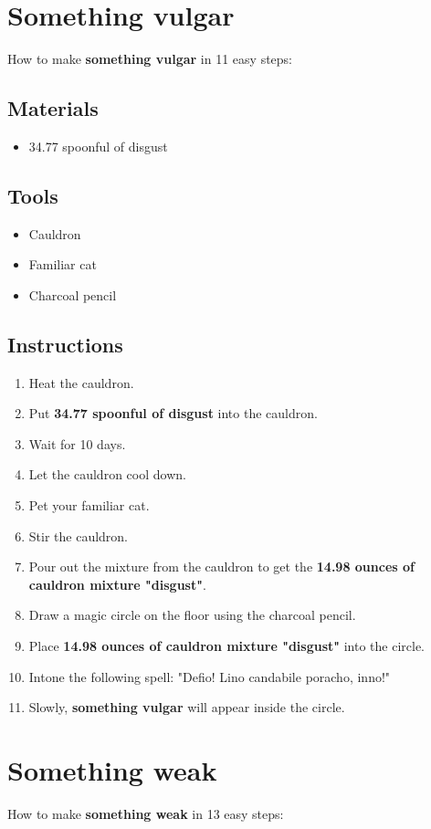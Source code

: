 \documentclass{article}
\begin{document}
\section{Something vulgar}How to make \textbf{something vulgar} in 11 easy steps:

\subsection{Materials}\begin{itemize}
\item 
34.77 spoonful of disgust
\end{itemize}
\subsection{Tools}\begin{itemize}
\item 
Cauldron
\item 
Familiar cat
\item 
Charcoal pencil
\end{itemize}
\subsection{Instructions}\begin{enumerate}
\item 
Heat the cauldron.
\item 
Put \textbf{34.77 spoonful of disgust} into the cauldron.
\item 
Wait for 10 days.
\item 
Let the cauldron cool down.
\item 
Pet your familiar cat.
\item 
Stir the cauldron.
\item 
Pour out the mixture from the cauldron to get the \textbf{14.98 ounces of cauldron mixture "disgust"}.
\item 
Draw a magic circle on the floor using the charcoal pencil.
\item 
Place \textbf{14.98 ounces of cauldron mixture "disgust"} into the circle.
\item 
Intone the following spell: "Defio! Lino candabile poracho, inno!"
\item 
Slowly, \textbf{something vulgar} will appear inside the circle.
\end{enumerate}
\newpage
\section{Something weak}How to make \textbf{something weak} in 13 easy steps:
\end{document}
